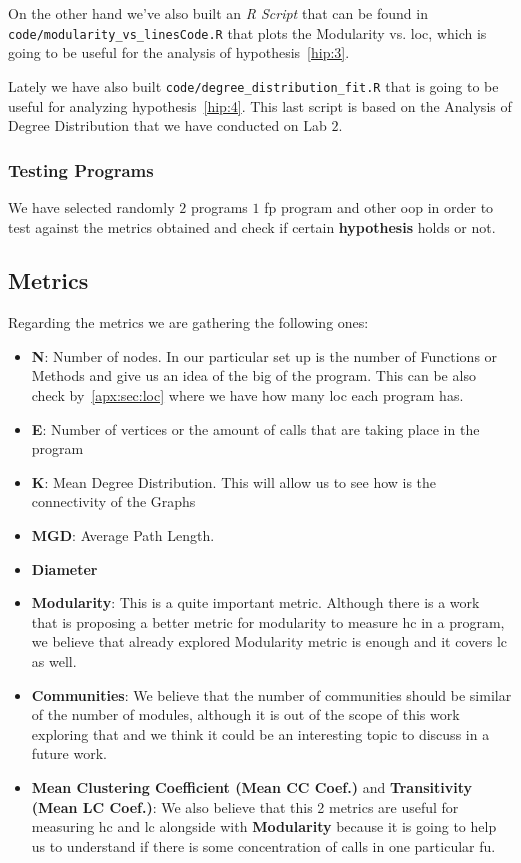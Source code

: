 \documentclass[12pt, a4paper]{article}
\begin{document}
On the other hand we've also built an \textit{R Script} that can be found in \texttt{code/modularity_vs_linesCode.R} 
that plots the Modularity vs. \acrlong{loc}, which is going to be useful for the analysis of hypothesis~\ref{hip:3}.

Lately we have also built \texttt{code/degree_distribution_fit.R} that is going to be useful for analyzing hypothesis~\ref{hip:4}. This last script is based on the Analysis of Degree Distribution that
we have conducted on Lab $2$.

\subsubsection{Testing Programs}
We have selected randomly $2$ programs $1$ \acrfull{fp} program and other \acrfull{oop} in order to test against
the metrics obtained and check if certain \textbf{hypothesis} holds or not.

\subsection{Metrics}
Regarding the metrics we are gathering the following ones:

\begin{itemize}
    \item \textbf{N}: Number of nodes. In our particular set up is the number of Functions or Methods and give us an idea of the big of the program.
    This can be also check by~\ref{apx:sec:loc} where we have how many \acrlong{loc} each program has.
    \item \textbf{E}: Number of vertices or the amount of calls that are taking place in the program
    \item \textbf{K}: Mean Degree Distribution. This will allow us to see how is the connectivity of the Graphs
    \item \textbf{MGD}: Average Path Length. 
    \item \textbf{Diameter}
    \item \textbf{Modularity}: This is a quite important metric. Although there is a work~\cite{paper_cohesion} that is proposing a better metric for modularity
     to measure \acrlong{hc} in a program, we believe that already explored Modularity metric is enough and it covers \acrlong{lc} as well.
    \item \textbf{Communities}: We believe that the number of communities should be similar of the number of modules, although it is out of the scope of this work exploring that
    and we think it could be an interesting topic to discuss in a future work.
    \item \textbf{Mean Clustering Coefficient (Mean CC Coef.)} and \textbf{Transitivity (Mean LC Coef.)}: We also believe that this 2 metrics are useful for measuring \acrlong{hc} and \acrlong{lc}
    alongside with \textbf{Modularity} because it is going to help us to understand if there is some concentration of calls in one particular \acrlong{fu}.
\end{itemize}
\end{document}
